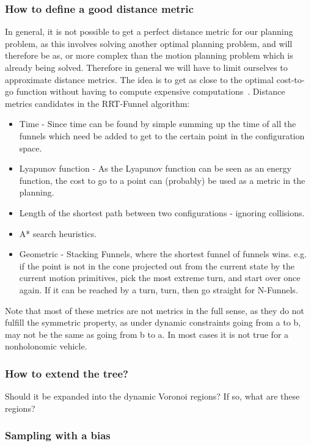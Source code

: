 \subsubsection{How to define a good distance metric}
In general, it is not possible to get a perfect distance metric for our planning
problem, as this involves solving another optimal planning problem, and will
therefore be as, or more complex than the motion planning problem which is
already being solved. Therefore in general we will have to limit ourselves to
approximate distance metrics. The idea is to get as close to the optimal
cost-to-go function without having to compute expensive
computations~\cite{Lav06}. Distance metrics candidates in the RRT-Funnel
algorithm:
\begin{itemize}
\item Time - Since time can be found by simple summing up the time of all the
  funnels which need be added to get to the certain point in the configuration
  space.
\item Lyapunov function - As the Lyapunov function can be seen as an energy
  function, the cost to go to a point can (probably) be used as a metric in the
  planning.
\item Length of the shortest path between two configurations - ignoring
  collisions.
\item A* search heuristics.
\item Geometric - Stacking Funnels, where the shortest funnel of funnels wins.
  e.g. if the point is not in the cone projected out from the current state by
  the current motion primitives, pick the most extreme turn, and start over once
  again. If it can be reached by a turn, turn, then go straight for N-Funnels.
\end{itemize}

Note that most of these metrics are not metrics in the full sense, as they do
not fulfill the symmetric property, as under dynamic constraints going from a to
b, may not be the same as going from b to a. In most cases it is not true for a
nonholonomic vehicle.

\subsubsection{How to extend the tree?}

Should it be expanded into the dynamic Voronoi regions? If so, what are these
regions?

\subsubsection{Sampling with a bias}

